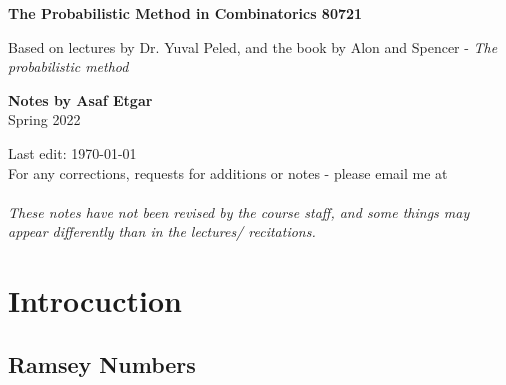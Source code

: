 \documentclass[a4paper, 11pt, oneside]{book}
\begin{document}
\begin{titlepage}
    \begin{center}
        \vspace*{1cm}

        \LARGE
        \textbf{The Probabilistic Method in Combinatorics 80721}

        \vspace{0.5cm}
        \Large
        Based on lectures by Dr. Yuval Peled, and the book by Alon and Spencer - \emph{The probabilistic method}

        \vspace{1.5cm}
        \large
        \textbf{Notes by Asaf Etgar}\\
        Spring 2022\\
        




        \vspace{0.8cm}

        \large
        Last edit:
        \today \\
        For any corrections, requests for additions or notes - please email me at \\
        \\
        		\vspace{0.8cm}
        \textit{These notes have not been revised by the course staff, and some things may appear differently than in the lectures/ recitations.}

    \end{center}
\end{titlepage}

\tableofcontents
\chapter{Introcuction}
\section{Ramsey Numbers}
\end{document}
